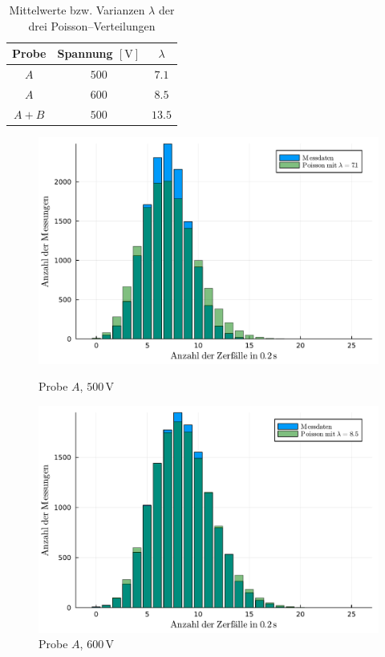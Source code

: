 \documentclass[12pt,a4paper]{scrartcl}
\numberwithin{equation}{section} %
\renewcommand{\[}{} %
\renewcommand{\]}{\noindent} %
\begin{document}
\begin{table}[h!]
	\centering
	\begin{tabular}{c|c|c}
		Probe & Spannung $[\mathrm{V}]$ & $\lambda$ \\
		\hline
		$A$ & $500$ & $7.1$ \\
		$A$ & $600$ & $8.5$ \\
		$A+B$ & $500$ & $13.5$ \\
	\end{tabular}
	\caption{Mittelwerte bzw. Varianzen $\lambda$  der drei Poisson--Verteilungen}
	\label{table:poisson}
\end{table}

\begin{figure}
	\centering
	\begin{minipage}{0.49\textwidth}
		\centering
		\includegraphics[width=\textwidth]{../media/B3.1/poisson1.pdf}
		\caption*{Probe $A$, $500 \mathrm{\, V}$}
	\end{minipage}
	\begin{minipage}{0.49\textwidth}
		\centering
		\includegraphics[width=\textwidth]{../media/B3.1/poisson2.pdf}
		\caption*{Probe $A$, $600 \mathrm{\, V}$}
	\end{minipage}
	\vspace{3pt}


\end{figure}
\end{document}
